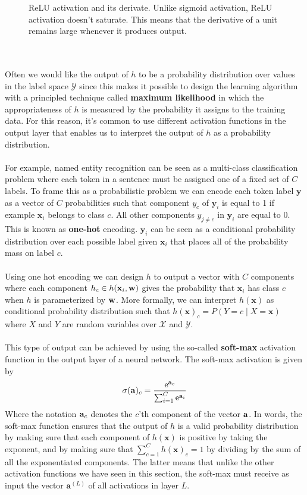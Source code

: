 \begin{figure}
	\centering
	
	\caption{ReLU activation and its derivate. Unlike sigmoid activation, ReLU activation doesn't saturate. This means that the derivative of a unit remains large whenever it produces output.}
	\label{relu}
\end{figure}
\\\\
Often we would like the output of $h$ to be a probability distribution over values in the label space $\mathcal{Y}$ since this makes it possible to design the learning algorithm with a principled technique called \textbf{maximum likelihood} in which the appropriateness of $h$ is measured by the probability it assigns to the training data. For this reason, it's common to use different activation functions in the output layer that enables us to interpret the output of $h$ as a probability distribution. 
\\\\
For example, named entity recognition can be seen as a multi-class classification problem where each token in a sentence must be assigned one of a fixed set of $C$ labels. To frame this as a probabilistic problem we can encode each token label $\mathbf{y}$ as a vector of $C$ probabilities such that component $y_c$ of $\mathbf{y}_i$ is equal to 1 if example $\mathbf{x}_i$ belongs to class $c$. All other components $y_{j\neq c}$ in $\mathbf{y}_i$ are equal to 0. This is known as \textbf{one-hot} encoding. $\mathbf{y}_i$ can be seen as a conditional probability distribution over each possible label given $\mathbf{x}_i$ that places all of the probability mass on label $c$.
\\\\
Using one hot encoding we can design $h$ to output a vector with $C$ components where each component $h_c \in h(\mathbf{x}_i, \mathbf{w})$ gives the probability that $\mathbf{x}_i$ has class $c$ when $h$ is parameterized by $\mathbf{w}$. More formally, we can interpret $h(\mathbf{x})$ as conditional probability distribution such that $h(\mathbf{x})_c = P(Y = c \mid X = \mathbf{x})$ where $X$ and $Y$ are random variables over $\mathcal{X}$ and $\mathcal{Y}$.
\\\\
This type of output can be achieved by using the so-called \textbf{soft-max} activation function in the output layer of a neural network. The soft-max activation is given by 
$$
\sigma(\mathbf{a})_c = \frac{\mathrm{e}^{\mathbf{a}_c}}{\sum_{i = 1}^C \mathrm{e}^{\mathbf{a}_i}}
$$ 
Where the notation $\mathbf{a}_c$ denotes the $c$'th component of the vector $\mathbf{a}$. In words, the soft-max function ensures that the output of $h$ is a valid probability distribution by making sure that each component of $h(\mathbf{x})$ is positive by taking the exponent, and by making sure that $\sum_{c=1}^Ch(\mathbf{x})_c = 1$ by dividing by the sum of all the exponentiated components. The latter means that unlike the other activation functions we have seen in this section, the soft-max must receive as input the vector $\mathbf{a}^{(L)}$ of all activations in layer $L$.
